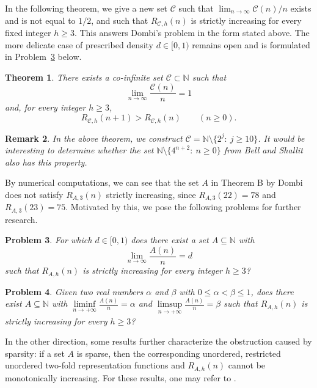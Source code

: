 \documentclass[11pt]{amsart}
\newtheorem{theorem}{Theorem}[section]
\newtheorem{remark}[theorem]{Remark}
\newtheorem{problem}[theorem]{Problem}
\theoremstyle{remark}
\theoremstyle{plain}
\newcommand{\NewB}{\mathcal C}
\begin{document}
In the following theorem, we give a new set $\NewB$ such that $\lim_{n\to\infty}\NewB(n)/n$ exists and is not equal to $1/2$, and such that $R_{\NewB,h}(n)$ is strictly increasing for every fixed integer $h\ge 3$. This answers Dombi's problem in the form stated above. The more delicate case of prescribed density $d\in [0,1)$ remains open and is formulated in Problem~\ref{prob:density} below.

\begin{theorem}\label{thm:main2}
There exists a co-infinite set $\NewB \subset \mathbb{N}$ such that
\[
\lim_{n \rightarrow \infty} \frac{\NewB(n)}{n}=1
\]
and, for every integer $h\ge 3$,
\[
R_{\NewB,h}(n+1)>R_{\NewB,h}(n)\qquad(n\ge 0).
\]
\end{theorem}

\begin{remark}
In the above theorem, we construct $\NewB=\mathbb N\setminus \{2^j:\ j\ge 10\}$. It would be interesting to determine whether the set $\mathbb N\setminus \{4^{n+2}:\ n\ge 0\}$ from Bell and Shallit \cite{BellShallit} also has this property.
\end{remark}

By numerical computations, we can see that the set $A$ in Theorem B by Dombi does not satisfy
$R_{A,3}(n)$ strictly increasing, since $R_{A,3}(22)=78$ and $R_{A,3}(23)=75$. Motivated by this,
we pose the following problems for further research.

\begin{problem}\label{prob:density} For which \(d\in[0,1)\) does there exist a set \(A\subseteq\mathbb N\) with
\[
\lim_{n\to\infty}\frac{A(n)}{n}=d
\]
such that \(R_{A,h}(n)\) is strictly increasing for every integer \(h\ge 3\)?
\end{problem}

\begin{problem} Given two real numbers $\alpha$ and $\beta$ with $0\le \alpha<\beta\le 1$, does there exist $A \subseteq \mathbb{N}$ with $\liminf\limits_{n\rightarrow +\infty}\frac{A(n)}{n}=\alpha$ and
 $\limsup\limits_{n\rightarrow +\infty}\frac{A(n)}{n}=\beta$ such that $R_{A, h}(n)$ is strictly increasing for every $h \geq 3$?
\end{problem}

In the other direction, some results further characterize the obstruction caused by sparsity: if a set $A$ is sparse, then the corresponding unordered, restricted unordered two-fold representation functions  and $R_{A,h}(n)$  cannot be monotonically increasing. For these results, one may refer to \cite{Balasubramanian,ESS4,ESS5,Kiss,KissSandorYang,Tang}.
\end{document}
